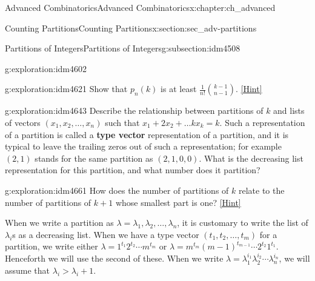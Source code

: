 \documentclass[oneside,10pt,]{book}
\newcommand{\terminology}[1]{\textbf{#1}}
\numberwithin{equation}{chapter}
\begin{document}
\begin{chapterptx}{Advanced Combinatorics}{}{Advanced Combinatorics}{}{}{x:chapter:ch_advanced}
\begin{sectionptx}{Counting Partitions}{}{Counting Partitions}{}{}{x:section:sec_adv-partitions}
\begin{subsectionptx}{Partitions of Integers}{}{Partitions of Integers}{}{}{g:subsection:idm4508}
\begin{exploration}{}{g:exploration:idm4602}
\end{exploration}
\begin{exploration}{}{g:exploration:idm4621}%
Show that \(p_n(k)\) is at least \(\frac{1}{n!}\binom{k-1}{n-1}\).%
\space\hspace*{0pt}\hfill{\tiny\hyperlink{g:hint:idm4626-back}{[Hint]}}\end{exploration}
\begin{exploration}{}{g:exploration:idm4643}%
Describe the relationship between partitions of \(k\) and lists of vectors \((x_1,x_2,\ldots,x_n)\) such that \(x_1+2x_2+\ldots kx_k = k\).  Such a representation of a partition is called a \terminology{type vector} representation of a partition, and it is typical to leave the trailing zeros out of such a representation; for example \((2,1)\) stands for the same partition as \((2,1,0,0)\). What is the decreasing list representation for this partition, and what number does it partition?%
\end{exploration}
\begin{exploration}{}{g:exploration:idm4661}%
How does the number of partitions of \(k\) relate to the number of partitions of \(k+1\) whose smallest part is one?%
\space\hspace*{0pt}\hfill{\tiny\hyperlink{g:hint:idm4666-back}{[Hint]}}\end{exploration}
When we write a partition as \(\lambda = \lambda_1,\lambda_2,\ldots,\lambda_n\), it is customary to write the list of \(\lambda_i\)s as a decreasing list. When we have a type vector \((t_1,t_2,\ldots,t_m)\) for a partition, we write either \(\lambda = 1^{t_1}2^{t_2}\cdots m^{t_m}\) or \(\lambda = m^{t_m}(m-1)^{t_{m-1}}\cdots 2^{t_2}1^{t_1}\). Henceforth we will use the second of these. When we write \(\lambda=\lambda_1^{i_1}\lambda_2^{i_2}\cdots\lambda_n^{i_n}\), we will assume that \(\lambda_i>\lambda_i+1\).%
\par

\end{subsectionptx}
\end{sectionptx}
\end{chapterptx}
\end{document}
